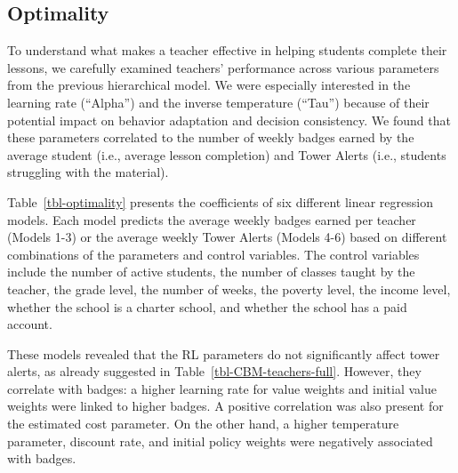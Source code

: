 \documentclass[
  number,
  preprint,
  3p,
  onecolumn]{elsarticle}
\begin{document}
\subsection{Optimality}\label{optimality}

To understand what makes a teacher effective in helping students
complete their lessons, we carefully examined teachers' performance
across various parameters from the previous hierarchical model. We were
especially interested in the learning rate (``Alpha'') and the inverse
temperature (``Tau'') because of their potential impact on behavior
adaptation and decision consistency. We found that these parameters
correlated to the number of weekly badges earned by the average student
(i.e., average lesson completion) and Tower Alerts (i.e., students
struggling with the material).

Table~\ref{tbl-optimality} presents the coefficients of six different
linear regression models. Each model predicts the average weekly badges
earned per teacher (Models 1-3) or the average weekly Tower Alerts
(Models 4-6) based on different combinations of the parameters and
control variables. The control variables include the number of active
students, the number of classes taught by the teacher, the grade level,
the number of weeks, the poverty level, the income level, whether the
school is a charter school, and whether the school has a paid account.

These models revealed that the RL parameters do not significantly affect
tower alerts, as already suggested in Table~\ref{tbl-CBM-teachers-full}.
However, they correlate with badges: a higher learning rate for value
weights and initial value weights were linked to higher badges. A
positive correlation was also present for the estimated cost parameter.
On the other hand, a higher temperature parameter, discount rate, and
initial policy weights were negatively associated with badges.
\end{document}
